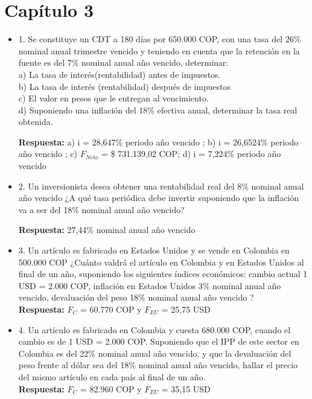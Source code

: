 \chapter*{Capítulo 3}

\begin{itemize}

 \item 1. Se  constituye  un  CDT  a  180  días  por 650.000 COP,  con  una  tasa  del  26\% nominal anual trimestre vencido y teniendo  en  cuenta  que  la retención en la fuente es del 7\% nominal anual año vencido, determinar:\\

       a) La tasa de interés(rentabilidad) antes de impuestos.\\
       b) La tasa de interés (rentabilidad) después de impuestos\\
       c) El valor en pesos que le entregan al vencimiento.\\
       d) Suponiendo una inflación del 18\% efectiva anual, determinar la tasa real obtenida.
       
       \textbf{Respuesta:} a) i = 28,647\% periodo año vencido ; b) i = 26,6524\% periodo año vencido ; c) $F_{Neto}$ = \$ 731.139,02 COP; d) i = 7,224\% periodo año vencido\\
       \medskip

 \item 2. Un inversionista desea  obtener  una  rentabilidad  real  del  8\%  nominal anual año vencido ¿A qué tasa periódica debe invertir suponiendo que la inflación va a ser del 18\% nominal anual año vencido?

       \textbf{Respuesta:} 27,44\% nominal anual año vencido \\
       \medskip

 \item 3. Un  artículo  es  fabricado  en  Estados  Unidos  y  se  vende  en  Colombia  en 500.000 COP ¿Cuánto  valdrá  el  artículo  en  Colombia  y  en  Estados  Unidos  al final  de  un  año,  suponiendo  los  siguientes  índices  económicos: cambio actual 1 USD = 2.000 COP, inflación en Estados Unidos 3\% nominal anual año vencido, devaluación del peso 18\% nominal anual año vencido ?\\
       \textbf{Respuesta:} $F_{C}$ =  60.770 COP y $F_{EU}$ =  25,75 USD\\
       \medskip

 \item 4. Un  artículo  es fabricado en  Colombia  y  cuesta 680.000 COP,  cuando  el cambio es de 1 USD = 2.000 COP. Suponiendo que el IPP de este sector en Colombia es del 22\% nominal anual año vencido, y que la devaluación del peso frente al dólar sea del 18\% nominal anual año vencido, hallar el precio del mismo artículo en cada país al final de un año.\\
       \textbf{Respuesta:} $F_{C}$ = 82.960 COP y $F_{EU}$ = 35,15 USD\\
       \medskip


\end{itemize}
